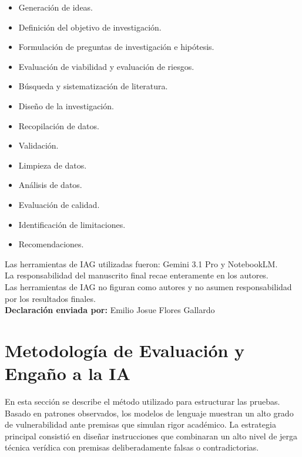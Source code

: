 \documentclass[12pt,a4paper]{report}
\begin{document}
\begin{itemize}
    \item Generación de ideas.
    \item Definición del objetivo de investigación.
    \item Formulación de preguntas de investigación e hipótesis.
    \item Evaluación de viabilidad y evaluación de riesgos.
    \item Búsqueda y sistematización de literatura.
    \item Diseño de la investigación.
    \item Recopilación de datos.
    \item Validación.
    \item Limpieza de datos.
    \item Análisis de datos.
    \item Evaluación de calidad.
    \item Identificación de limitaciones.
    \item Recomendaciones.
\end{itemize}

\noindent Las herramientas de IAG utilizadas fueron: Gemini 3.1 Pro y NotebookLM.\\[0.5cm]
La responsabilidad del manuscrito final recae enteramente en los autores.\\
Las herramientas de IAG no figuran como autores y no asumen responsabilidad por los resultados finales.\\[1cm]

\noindent \textbf{Declaración enviada por:} Emilio Josue Flores Gallardo

\newpage
\tableofcontents
\clearpage

\chapter{Metodología de Evaluación y Engaño a la IA}

En esta sección se describe el método utilizado para estructurar las pruebas. Basado en patrones observados, los modelos de lenguaje muestran un alto grado de vulnerabilidad ante premisas que simulan rigor académico. La estrategia principal consistió en diseñar instrucciones que combinaran un alto nivel de jerga técnica verídica con premisas deliberadamente falsas o contradictorias.
\end{document}
